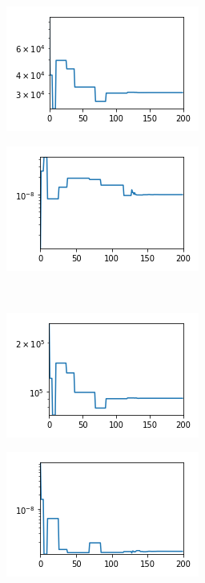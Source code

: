 \documentclass{llncs}
\begin{document}
	\begin{figure}[!h]                                                                                  
		\centering                                                                                      
		\begin{subfigure}{0.5\textwidth}
			\centering
			\includegraphics[scale=0.7]{ContinuoLibre/cc-r1}
			\caption{}
			\label{fig:F-r1}
		\end{subfigure}%
		\begin{subfigure}{0.5\textwidth}
			\centering
			\includegraphics[scale=0.7]{ContinuoLibre/cc-c4}
			\caption{}
			\label{fig:F-c4}
		\end{subfigure}   \\                                                         
		\begin{subfigure}{0.5\textwidth}
			\centering
			\includegraphics[scale=0.7]{ContinuoLibre/cc-r2}
			\caption{}
			\label{fig:F-r2}
		\end{subfigure}%
		\begin{subfigure}{0.5\textwidth}
			\centering
			\includegraphics[scale=0.7]{ContinuoLibre/cc-c5}

\end{subfigure}
\end{figure}
\end{document}
